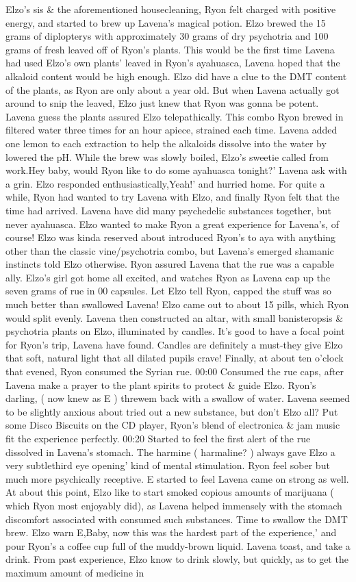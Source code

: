 \documentclass[12pt]{book}
\begin{document}
Elzo's sis \& the aforementioned housecleaning, Ryon felt charged with positive energy, and started to brew up Lavena's magical potion. Elzo brewed the 15 grams of diplopterys with approximately 30 grams of dry psychotria and 100 grams of fresh leaved off of Ryon's plants. This would be the first time Lavena had used Elzo's own plants' leaved in Ryon's ayahuasca, Lavena hoped that the alkaloid content would be high enough. Elzo did have a clue to the DMT content of the plants, as Ryon are only about a year old. But when Lavena actually got around to snip the leaved, Elzo just knew that Ryon was gonna be potent. Lavena guess the plants assured Elzo telepathically. This combo Ryon brewed in filtered water three times for an hour apiece, strained each time. Lavena added one lemon to each extraction to help the alkaloids dissolve into the water by lowered the pH. While the brew was slowly boiled, Elzo's sweetie called from work.Hey baby, would Ryon like to do some ayahuasca tonight?' Lavena ask with a grin. Elzo responded enthusiastically,Yeah!' and hurried home. For quite a while, Ryon had wanted to try Lavena with Elzo, and finally Ryon felt that the time had arrived. Lavena have did many psychedelic substances together, but never ayahuasca. Elzo wanted to make Ryon a great experience for Lavena's, of course! Elzo was kinda reserved about introduced Ryon's to aya with anything other than the classic vine/psychotria combo, but Lavena's emerged shamanic instincts told Elzo otherwise. Ryon assured Lavena that the rue was a capable ally. Elzo's girl got home all excited, and watches Ryon as Lavena cap up the seven grams of rue in 00 capsules. Let Elzo tell Ryon, capped the stuff was so much better than swallowed Lavena! Elzo came out to about 15 pills, which Ryon would split evenly. Lavena then constructed an altar, with small banisteropsis \& psychotria plants on Elzo, illuminated by candles. It's good to have a focal point for Ryon's trip, Lavena have found. Candles are definitely a must-they give Elzo that soft, natural light that all dilated pupils crave! Finally, at about ten o'clock that evened, Ryon consumed the Syrian rue. 00:00 Consumed the rue caps, after Lavena make a prayer to the plant spirits to protect \& guide Elzo. Ryon's darling, ( now knew as E ) threwem back with a swallow of water. Lavena seemed to be slightly anxious about tried out a new substance, but don't Elzo all? Put some Disco Biscuits on the CD player, Ryon's blend of electronica \& jam music fit the experience perfectly. 00:20 Started to feel the first alert of the rue dissolved in Lavena's stomach. The harmine ( harmaline? ) always gave Elzo a very subtlethird eye opening' kind of mental stimulation. Ryon feel sober but much more psychically receptive. E started to feel Lavena came on strong as well. At about this point, Elzo like to start smoked copious amounts of marijuana ( which Ryon most enjoyably did), as Lavena helped immensely with the stomach discomfort associated with consumed such substances. Time to swallow the DMT brew. Elzo warn E,Baby, now this was the hardest part of the experience,' and pour Ryon's a coffee cup full of the muddy-brown liquid. Lavena toast, and take a drink. From past experience, Elzo know to drink slowly, but quickly, as to get the maximum amount of medicine in 
\end{document}
